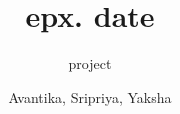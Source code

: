 \documentclass[14pt]{beamer}
\title[APP]{epx. date}
\subtitle{project}
\author[Team 26]{Avantika, Sripriya, Yaksha}
\begin{document}
\begin{frame}
	\titlepage
\end{frame}
\end{document}
